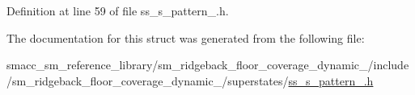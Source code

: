 Definition at line 59 of file ss\+\_\+s\+\_\+pattern\+\_.\+h.



The documentation for this struct was generated from the following file\+:\begin{DoxyCompactItemize}
\item 
smacc\+\_\+sm\+\_\+reference\+\_\+library/sm\+\_\+ridgeback\+\_\+floor\+\_\+coverage\+\_\+dynamic\+\_/include/sm\+\_\+ridgeback\+\_\+floor\+\_\+coverage\+\_\+dynamic\+\_/superstates/\hyperlink{sm__ridgeback__floor__coverage__dynamic__1_2include_2sm__ridgeback__floor__coverage__dynamic__1_28e2e1439a9c4470806376ad3c1e1209}{ss\+\_\+s\+\_\+pattern\+\_.\+h}\end{DoxyCompactItemize}
